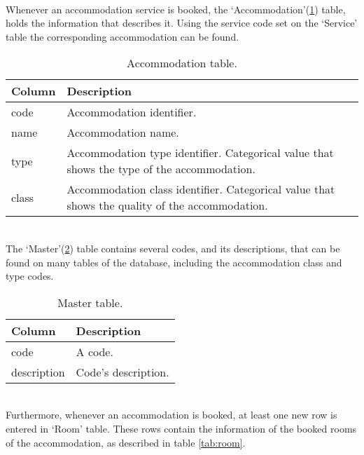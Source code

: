 \\
Whenever an accommodation service is booked, the `Accommodation'(\ref{tab:accommodation}) table, holds the information that describes it. Using the service code set on the `Service' table the corresponding accommodation can be found. \\
\begin{table}[ht]
\begin{center}
\begin{tabular}{l | p{12cm}}
\textcolor{theme}{\textbf{Column}} & \textcolor{theme}{\textbf{Description}}\\
\hline
code & Accommodation identifier.\\
\hline
name & Accommodation name.\\
\hline
type & Accommodation type identifier. Categorical value that shows the type of the accommodation. \\
\hline
class & Accommodation class identifier. Categorical value that shows the quality of the accommodation. \\
\hline
\end{tabular}
\caption{Accommodation table.}
\label{tab:accommodation}
\end{center}
\end{table}
\\
The `Master'(\ref{tab:master}) table contains several codes, and its descriptions, that can be found on many tables of the database, including the accommodation class and type codes. \\
\begin{table}[ht]
\begin{center}
\begin{tabular}{l | p{12cm}}
\textcolor{theme}{\textbf{Column}} & \textcolor{theme}{\textbf{Description}}\\
\hline
code & A code.\\
\hline
description & Code's description.\\
\hline
\end{tabular}
\caption{Master table.}
\label{tab:master}
\end{center}
\end{table}
\\
Furthermore, whenever an accommodation is booked, at least one new row is entered in `Room' table. These rows contain the information of the booked rooms of the accommodation, as described in table \ref{tab:room}. \\

